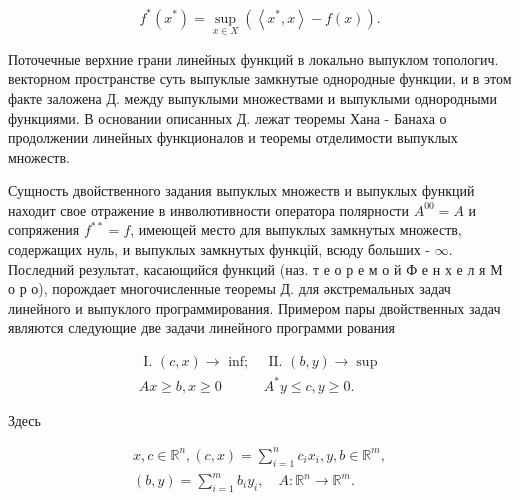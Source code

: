 \documentclass[10pt]{article}
\begin{document}
\[

f^{*}\left(x^{*}\right)=\sup _{x \in X}\left(\left\langle x^{*}, x\right\rangle-f(x)\right) .

\]



Поточечные верхние грани линейных функций в локально выпуклом топологич. векторном пространстве суть выпуклые замкнутые однородные функции, и в этом факте заложена Д. между выпуклыми множествами и выпуклыми однородными функциями. В основании описанных Д. лежат теоремы Хана - Банаха о продолжении линейных функционалов и теоремы отделимости выпуклых множеств.



Сущность двойственного задания выпуклых множеств и выпуклых функций находит свое отражение в инволютивности оператора полярности $A^{00}=A$ и сопряжения $f^{* *}=f$, имеющей место для выпуклых замкнутых множеств, содержащих нуль, и выпуклых замкнутых функцій, всюду больших - $\infty$. Последний результат, касающийся функций (наз. т е о р е м о й Ф е н х е л я М о р о), порождает многочисленные теоремы Д. для әкстремальных задач линейного и выпуклого программирования. Примером пары двойственных задач являются следующие две задачи линейного программи рования



\[

\begin{array}{cc}

\text { I. }(c, x) \longrightarrow \text { inf; } & \text { II. }(b, y) \longrightarrow \sup \\

A x \geqslant b, x \geqslant 0 & A^{*} y \leqslant c, y \geqslant 0 .

\end{array}

\]



Здесь



\[

\begin{gathered}

x, c \in \mathbb{R}^{n},(c, x)=\sum_{i=1}^{n} c_{i} x_{i}, y, b \in \mathbb{R}^{m}, \\

(b, y)=\sum_{i=1}^{m} b_{i} y_{i}, \quad A: \mathbb{R}^{n} \longrightarrow \mathbb{R}^{m} .

\end{gathered}

\]
\end{document}
